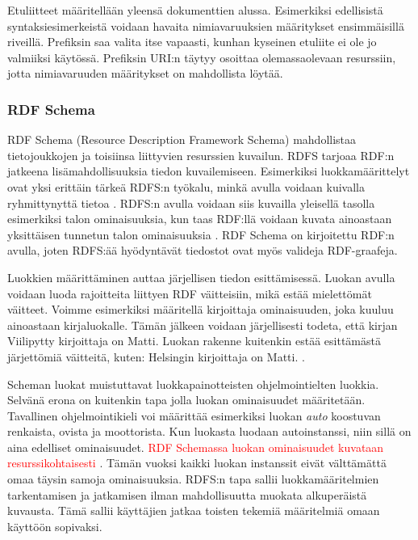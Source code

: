 \documentclass[finnish, 12pt, a4paper, elec, utf8, pdfa, online]{aaltothesis}
\begin{document}
Etuliitteet määritellään yleensä dokumenttien alussa. Esimerkiksi edellisistä syntaksiesimerkeistä voidaan havaita nimiavaruuksien määritykset ensimmäisillä riveillä. Prefiksin saa valita itse vapaasti, kunhan kyseinen etuliite ei ole jo valmiiksi käytössä. Prefiksin URI:n täytyy osoittaa olemassaolevaan resurssiin, jotta nimiavaruuden määritykset on mahdollista löytää.


\subsubsection{RDF Schema}
RDF Schema (Resource Description Framework Schema) mahdollistaa tietojoukkojen ja toisiinsa liittyvien resurssien kuvailun. RDFS tarjoaa RDF:n jatkeena lisämahdollisuuksia tiedon kuvailemiseen. Esimerkiksi luokkamäärittelyt ovat yksi erittäin tärkeä RDFS:n työkalu, minkä avulla voidaan kuivalla ryhmittynyttä tietoa \cite{W3C_RDFS2}. RDFS:n avulla voidaan siis kuvailla yleisellä tasolla esimerkiksi talon ominaisuuksia, kun taas RDF:llä voidaan kuvata ainoastaan yksittäisen tunnetun talon ominaisuuksia \cite{Antoniou}. RDF Schema on kirjoitettu RDF:n avulla, joten RDFS:ää hyödyntävät tiedostot ovat myös valideja RDF-graafeja. \cite{RDF_specification_old}

Luokkien määrittäminen auttaa järjellisen tiedon esittämisessä. Luokan avulla voidaan luoda rajoitteita liittyen RDF väitteisiin, mikä estää mielettömät väitteet. Voimme esimerkiksi määritellä kirjoittaja ominaisuuden, joka kuuluu ainoastaan kirjaluokalle. Tämän jälkeen voidaan järjellisesti todeta, että kirjan Viilipytty kirjoittaja on Matti. Luokan rakenne kuitenkin estää esittämästä järjettömiä väitteitä, kuten: Helsingin kirjoittaja on Matti. \cite{Antoniou}.

Scheman luokat muistuttavat luokkapainotteisten ohjelmointielten luokkia. Selvänä erona on kuitenkin tapa jolla luokan ominaisuudet määritetään. Tavallinen ohjelmointikieli voi määrittää esimerkiksi luokan \textit{auto} koostuvan renkaista, ovista ja moottorista. Kun luokasta luodaan autoinstanssi, niin sillä on aina edelliset ominaisuudet. \textcolor{red} {RDF Schemassa luokan ominaisuudet kuvataan resurssikohtaisesti} \cite{W3C_RDFS2}. Tämän vuoksi kaikki luokan instanssit eivät välttämättä omaa täysin samoja ominaisuuksia. RDFS:n tapa sallii luokkamääritelmien tarkentamisen ja jatkamisen ilman mahdollisuutta muokata alkuperäistä kuvausta. Tämä sallii käyttäjien jatkaa toisten tekemiä määritelmiä omaan käyttöön sopivaksi.
\end{document}
